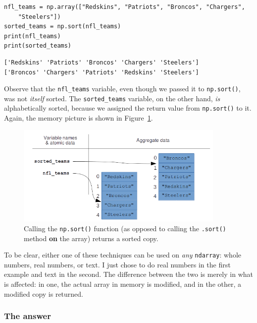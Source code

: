 \begin{Verbatim}[fontsize=\small,samepage=true,frame=single,framesep=3mm]
nfl_teams = np.array(["Redskins", "Patriots", "Broncos", "Chargers",
    "Steelers"])
sorted_teams = np.sort(nfl_teams)
print(nfl_teams)
print(sorted_teams)
\end{Verbatim}

\begin{Verbatim}[fontsize=\small,samepage=true,frame=leftline,framesep=5mm,framerule=1mm]
['Redskins' 'Patriots' 'Broncos' 'Chargers' 'Steelers']
['Broncos' 'Chargers' 'Patriots' 'Redskins' 'Steelers']
\end{Verbatim}

Observe that the \texttt{nfl\_teams} variable, even though we passed it to
\texttt{np.sort()}, was not \textit{itself} sorted. The \texttt{sorted\_teams}
variable, on the other hand, \textit{is} alphabetically sorted, because we
assigned the return value from \texttt{np.sort()} to it. Again, the memory
picture is shown in Figure~\ref{fig:npSortArray}.

\begin{figure}[ht]
\centering
\includegraphics[width=0.9\textwidth]{npSortArray.png}
\medskip
\caption{Calling the \texttt{np.sort()} function (as opposed to calling the
\texttt{.sort()} method \textbf{on} the array) returns a sorted copy.}
\label{fig:npSortArray}
\end{figure}

To be clear, either one of these techniques can be used on \textit{any}
\texttt{ndarray}: whole numbers, real numbers, or text. I just chose to do real
numbers in the first example and text in the second. The difference between the
two is merely in what is affected: in one, the actual array in memory is
modified, and in the other, a modified copy is returned.

\subsubsection{The answer}

